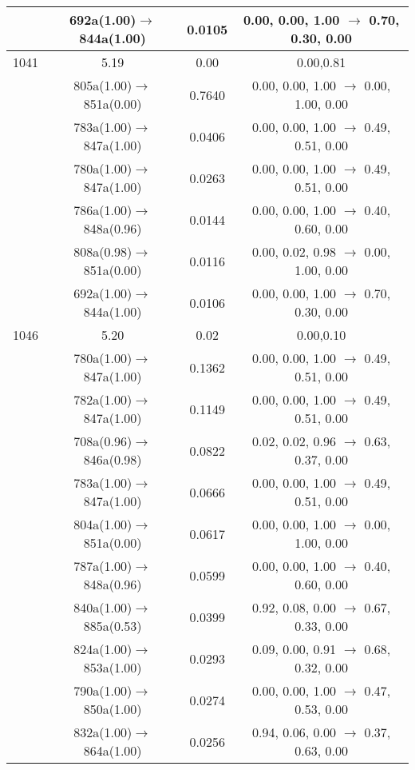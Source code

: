 \documentclass[10pt,a4paper]{article}
\begin{document}
\begin{longtable}{c|c|c|c}
 	& 692a(1.00)$\rightarrow$844a(1.00) &	 0.0105 &	 0.00, 0.00, 1.00 $\rightarrow$ 0.70, 0.30, 0.00 \\ 
 \hline1041 &	 5.19 &	 0.00 &	 0.00,0.81 \\ 
  	& 805a(1.00)$\rightarrow$851a(0.00) &	 0.7640 &	 0.00, 0.00, 1.00 $\rightarrow$ 0.00, 1.00, 0.00 \\ 
 	& 783a(1.00)$\rightarrow$847a(1.00) &	 0.0406 &	 0.00, 0.00, 1.00 $\rightarrow$ 0.49, 0.51, 0.00 \\ 
 	& 780a(1.00)$\rightarrow$847a(1.00) &	 0.0263 &	 0.00, 0.00, 1.00 $\rightarrow$ 0.49, 0.51, 0.00 \\ 
 	& 786a(1.00)$\rightarrow$848a(0.96) &	 0.0144 &	 0.00, 0.00, 1.00 $\rightarrow$ 0.40, 0.60, 0.00 \\ 
 	& 808a(0.98)$\rightarrow$851a(0.00) &	 0.0116 &	 0.00, 0.02, 0.98 $\rightarrow$ 0.00, 1.00, 0.00 \\ 
 	& 692a(1.00)$\rightarrow$844a(1.00) &	 0.0106 &	 0.00, 0.00, 1.00 $\rightarrow$ 0.70, 0.30, 0.00 \\ 
 \hline1046 &	 5.20 &	 0.02 &	 0.00,0.10 \\ 
  	& 780a(1.00)$\rightarrow$847a(1.00) &	 0.1362 &	 0.00, 0.00, 1.00 $\rightarrow$ 0.49, 0.51, 0.00 \\ 
 	& 782a(1.00)$\rightarrow$847a(1.00) &	 0.1149 &	 0.00, 0.00, 1.00 $\rightarrow$ 0.49, 0.51, 0.00 \\ 
 	& 708a(0.96)$\rightarrow$846a(0.98) &	 0.0822 &	 0.02, 0.02, 0.96 $\rightarrow$ 0.63, 0.37, 0.00 \\ 
 	& 783a(1.00)$\rightarrow$847a(1.00) &	 0.0666 &	 0.00, 0.00, 1.00 $\rightarrow$ 0.49, 0.51, 0.00 \\ 
 	& 804a(1.00)$\rightarrow$851a(0.00) &	 0.0617 &	 0.00, 0.00, 1.00 $\rightarrow$ 0.00, 1.00, 0.00 \\ 
 	& 787a(1.00)$\rightarrow$848a(0.96) &	 0.0599 &	 0.00, 0.00, 1.00 $\rightarrow$ 0.40, 0.60, 0.00 \\ 
 	& 840a(1.00)$\rightarrow$885a(0.53) &	 0.0399 &	 0.92, 0.08, 0.00 $\rightarrow$ 0.67, 0.33, 0.00 \\ 
 	& 824a(1.00)$\rightarrow$853a(1.00) &	 0.0293 &	 0.09, 0.00, 0.91 $\rightarrow$ 0.68, 0.32, 0.00 \\ 
 	& 790a(1.00)$\rightarrow$850a(1.00) &	 0.0274 &	 0.00, 0.00, 1.00 $\rightarrow$ 0.47, 0.53, 0.00 \\ 
 	& 832a(1.00)$\rightarrow$864a(1.00) &	 0.0256 &	 0.94, 0.06, 0.00 $\rightarrow$ 0.37, 0.63, 0.00 \\ 

\end{longtable}
\end{document}
